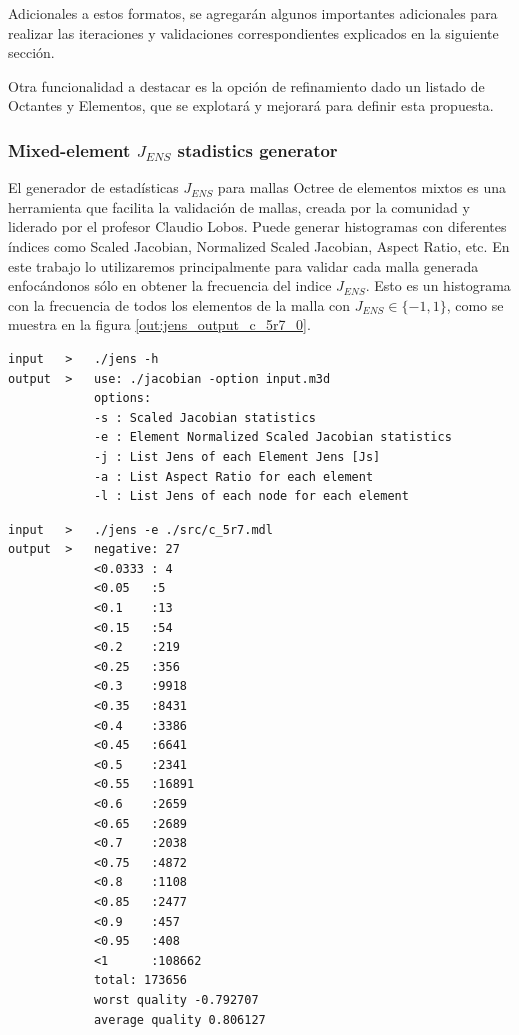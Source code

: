 Adicionales a estos formatos, se agregarán algunos importantes adicionales para realizar las iteraciones y validaciones correspondientes explicados en la siguiente sección.

Otra funcionalidad a destacar es la opción de refinamiento dado un listado de Octantes y Elementos, que se explotará y mejorará para definir esta propuesta.

\subsubsection{Mixed-element $J_{ENS}$ stadistics generator}

El generador de estadísticas $J_{ENS}$ para mallas Octree de elementos mixtos es una herramienta que facilita la validación de mallas, creada por la comunidad y liderado por el profesor Claudio Lobos. Puede generar histogramas con diferentes índices como Scaled Jacobian, Normalized Scaled Jacobian, Aspect Ratio, etc. 
En este trabajo lo utilizaremos principalmente para validar cada malla generada enfocándonos sólo en obtener la frecuencia del indice $J_{ENS}$. Esto es un histograma con la frecuencia de todos los elementos de la malla con $J_{ENS} \in \{-1 , 1\}$, como se muestra en la figura \autoref{out:jens_output_c_5r7_0}.

\begin{lstlisting}[style=console,caption={Opciones de jens calculator. \\ Fuente: Elaboración propia.}]
input   >   ./jens -h
output  >   use: ./jacobian -option input.m3d
            options:
            -s : Scaled Jacobian statistics
            -e : Element Normalized Scaled Jacobian statistics
            -j : List Jens of each Element Jens [Js]
            -a : List Aspect Ratio for each element
            -l : List Jens of each node for each element
\end{lstlisting}


\begin{lstlisting}[style=console,label={out:jens_output_c_5r7_0},caption={Estadísticas Jens para malla inicial, muestra una lista de frecuencias para diferentes cotas superiores para la calidad Jens encontrada en la malla.\\ Fuente: Elaboración propia.}]
input   >   ./jens -e ./src/c_5r7.mdl
output  >   negative: 27
            <0.0333 : 4
            <0.05   :5
            <0.1    :13
            <0.15   :54
            <0.2    :219
            <0.25   :356
            <0.3    :9918
            <0.35   :8431
            <0.4    :3386
            <0.45   :6641
            <0.5    :2341
            <0.55   :16891
            <0.6    :2659
            <0.65   :2689
            <0.7    :2038
            <0.75   :4872
            <0.8    :1108
            <0.85   :2477
            <0.9    :457
            <0.95   :408
            <1      :108662
            total: 173656
            worst quality -0.792707
            average quality 0.806127
\end{lstlisting}


